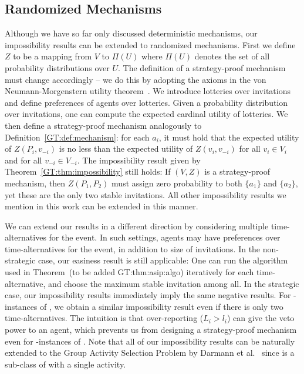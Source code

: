 \subsection{Randomized Mechanisms} \label{GT:sec:randomized}
Although we have so far only discussed deterministic mechanisms, our impossibility results can be extended to randomized mechanisms. First we define $Z$ to be a mapping from $V$ to $\Pi(U)$ where $\Pi(U)$ denotes the set of all probability distributions over $U$. The definition of a strategy-proof mechanism must change accordingly -- we do this by adopting the axioms in the von Neumann-Morgenstern utility theorem~\cite{von1947theory}. We introduce lotteries over invitations and define preferences of agents over lotteries. Given a probability distribution over invitations, one can compute the expected cardinal utility of lotteries. We then define a strategy-proof mechanism analogously to Definition~\ref{GT:def:mechanism}: for each $a_i$, it must hold that the expected utility of $Z(P_i, v_{-i})$ is no less than the expected utility of $Z(v_i, v_{-i})$ for all $v_i\in V_i$ and for all $v_{-i} \in V_{-i}$. The impossibility result given by Theorem~\ref{GT:thm:impossibility} still holds: If $(V, Z)$ is a strategy-proof mechanism, then $Z(P_1, P_2)$ must assign zero probability to both $\{a_1\}$ and $\{a_2\}$, yet these are the only two stable invitations.  All other impossibility results we mention in this work can be extended in this manner.

We can extend our results in a different direction by considering multiple time-alternatives for the event. In such settings, agents may have preferences over time-alternatives for the event, in addition to size of invitations.   
In the non-strategic case, our easiness result is still applicable: One can run the algorithm used in Theorem~(to be added  GT:thm:asip:algo) iteratively for each time-alternative, and choose the maximum stable invitation among all.
In the strategic case, our impossibility results immediately imply the same negative results. 
For \INC-instances of \ASIP, we obtain a similar impossibility result even if there is only two time-alternatives. The intuition is that over-reporting ($L_i > l_i$) can give the veto power to an agent, which prevents us from designing a strategy-proof mechanism even for \INC-instances of \ASIP. Note that all of our impossibility results can be naturally extended to the Group Activity Selection Problem by Darmann et al.~\cite{GASP12WINE} since \ASIPs is a sub-class of \GASPs with a single activity.


